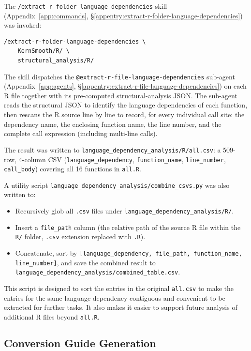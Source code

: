 \documentclass[12pt,a4paper]{article}
\begin{document}
The \texttt{/extract-r-folder-language-dependencies} skill (Appendix~\ref{app:commands}, \S\ref{appentry:extract-r-folder-language-dependencies}) was invoked:

\begin{lstlisting}[style=shell]
/extract-r-folder-language-dependencies \
    KernSmooth/R/ \
    structural_analysis/R/
\end{lstlisting}

The skill dispatches the \texttt{@extract-r-file-language-dependencies} sub-agent (Appendix~\ref{app:agents}, \S\ref{appentry:extract-r-file-language-dependencies}) on each R file together with its pre-computed structural-analysis JSON. The sub-agent reads the structural JSON to identify the language dependencies of each function, then rescans the R source line by line to record, for every individual call site: the dependency name, the enclosing function name, the line number, and the complete call expression (including multi-line calls).

The result was written to \texttt{language\_dependency\_analysis/R/all.csv}: a 509-row, 4-column CSV (\texttt{language\_dependency}, \texttt{function\_name}, \texttt{line\_number}, \texttt{call\_body}) covering all 16 functions in \texttt{all.R}.

A utility script \texttt{language\_dependency\_analysis/combine\_csvs.py} was also written to:
\begin{itemize}
  \item Recursively glob all \texttt{.csv} files under \texttt{language\_dependency\_analysis/R/}.
  \item Insert a \texttt{file\_path} column (the relative path of the source R file within the \texttt{R/} folder, \texttt{.csv} extension replaced with \texttt{.R}).
  \item Concatenate, sort by \texttt{[language\_dependency, file\_path, function\_name, line\_number]}, and save the combined result to \texttt{language\_dependency\_analysis/combined\_table.csv}.
\end{itemize}

This script is designed to sort the entries in the original \texttt{all.csv} to make the entries for the same language dependency contiguous and convenient to be extracted for further tasks. It also makes it easier to support future analysis of additional R files beyond \texttt{all.R}.

\subsection{Conversion Guide Generation}
\end{document}
